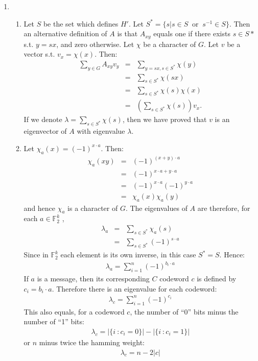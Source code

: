 \documentclass[11pt]{article} \usepackage{amssymb}
\begin{document}
\begin{enumerate}
\begin{enumerate}
  \end{enumerate}
\item
  \begin{enumerate}
  \item 
  Let $S$ be the set which defines $H'$. Let 
  $S^*=\{s|s\in S\;\;\mbox{or}\;\;s^{-1}\in S\}$. 
  Then an alternative definition of $A$ is that 
  $A_{xy}$ equals one if there exists
  $s\in S*$ s.t. $y=sx$, and zero otherwise. Let $\chi$
  be a character of $G$. Let $v$ be a vector s.t. $v_x=\chi(x)$. Then:
  \begin{eqnarray*}
      \sum_{y\in G}A_{xy}v_y&=&\sum_{y=sx,s\in S^*}\chi(y)
    \\ &=&\sum_{s\in S^*}\chi(sx)
    \\ &=&\sum_{s\in S^*}\chi(s)\chi(x)
    \\ &=&\left(\sum_{s\in S^*}\chi(s)\right)v_x.
  \end{eqnarray*}
  If we denote $\lambda = \sum_{s\in S^*}\chi(s)$, then
  we have proved that $v$ is an eigenvector of $A$ with eigenvalue $\lambda$.
  \item
  Let $\chi_a(x)=(-1)^{x\cdot a}$. Then:
  \begin{eqnarray*}
    \chi_a(xy)&=&(-1)^{(x+y)\cdot a}
    \\ &=& (-1)^{x\cdot a+y\cdot a}
    \\ &=& (-1)^{x\cdot a}(-1)^{y\cdot a}
    \\ &=& \chi_a(x)\chi_a(y)
  \end{eqnarray*}
  and hence $\chi_a$ is a character of $G$. The eigenvalues of $A$ are therefore,
  for each $a\in \mathbb{F}_2^k$ , 
  \begin{eqnarray*}
    \lambda_a&=&\sum_{s\in S^*}\chi_a(s)
    \\ &=& \sum_{s\in S^*}(-1)^{s\cdot a}
  \end{eqnarray*}
  Since in $\mathbb{F}_2^k$ each element is its own inverse, in this case $S^*=S$. Hence:
  \begin{eqnarray*}
    \lambda_a=\sum_{i=1}^n(-1)^{b_i\cdot a}
  \end{eqnarray*}
  If $a$ is a message, then its corresponding $C$ codeword $c$ is defined
  by $c_i=b_i\cdot a$. Therefore there is an eigenvalue for each codeword:
  \begin{eqnarray*}
    \lambda_c=\sum_{i=1}^n(-1)^{c_i}
  \end{eqnarray*}
  This also equals, for a codeword $c$, the number of ``0'' bits minus 
  the number of ``1'' bits:
  \begin{eqnarray*}
    \lambda_c=|\{i\::c_i=0\}|-|\{i\::c_i=1\}|
  \end{eqnarray*}
  or $n$ minus twice the hamming weight:
  \begin{eqnarray*}
    \lambda_c=n-2|c|
  \end{eqnarray*}


\end{enumerate}
\end{enumerate}
\end{document}
